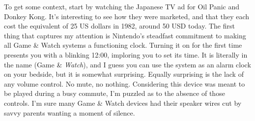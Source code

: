 \documentclass{book}
\let\oldcenter\center
\let\oldendcenter\endcenter
\renewenvironment{center}{\setlength\topsep{0pt}\oldcenter}{\oldendcenter}
\begin{document}
\begin{center}
\vspace{8pt}
\quad\vspace{4pt}
\quad\vspace{4pt}
\quad\vspace{4pt}
\quad\vspace{4pt}
\end{center}

To get some context, start by watching the Japanese TV ad for Oil Panic and Donkey Kong. It’s interesting to see how they were marketed, and that they each cost the equivalent of 25 US dollars in 1982, around 50 USD today. The first thing that captures my attention is Nintendo’s steadfast commitment to making all Game \& Watch systems a functioning clock. Turning it on for the first time presents you with a blinking 12:00, imploring you to set its time. It is literally in the name (Game \& \emph{Watch}), and I guess you can use the system as an alarm clock on your bedside, but it is somewhat surprising. Equally surprising is the lack of any volume control. No mute, no nothing. Considering this device was meant to be played during a busy commute, I’m puzzled as to the absence of those controls. I’m sure many Game \& Watch devices had their speaker wires cut by savvy parents wanting a moment of silence.
\end{document}
